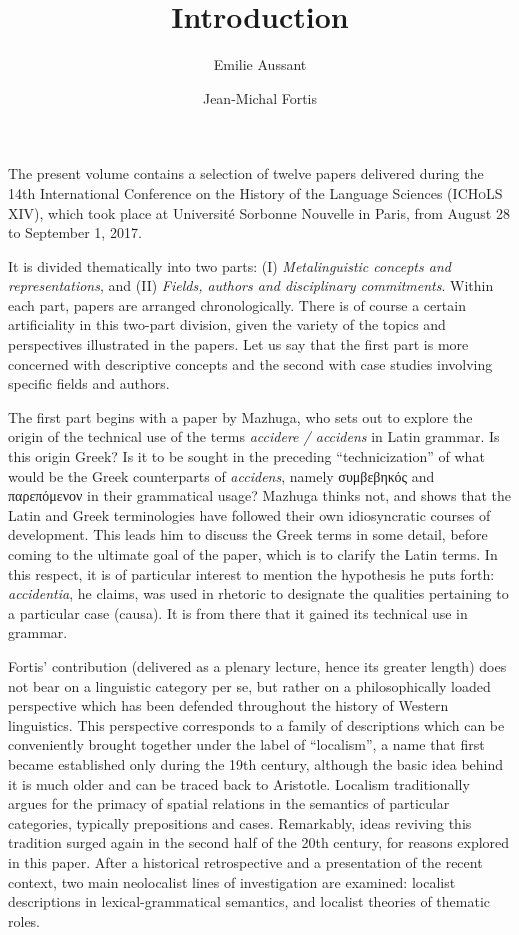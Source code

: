 \documentclass[output=paper]{langsci/langscibook}
\title{Introduction}
\author{Emilie Aussant  \affiliation{Histoire des Théories Linguistiques (CNRS / Université de Paris)} \and Jean-Michal Fortis \affiliation{Histoire des Théories Linguistiques (CNRS / Université de Paris)}}
\begin{document}
\maketitle

\noindent The present volume contains a selection of twelve papers delivered during the 14th International Conference on the History of the Language Sciences (\textsc{ICHoLS XIV}), which took place at Université Sorbonne Nouvelle in Paris, from August 28 to September 1, 2017.

It is divided thematically into two parts: (I) \emph{Metalinguistic concepts and representations}, and (II) \emph{Fields, authors and disciplinary commitments}. Within each part, papers are arranged chronologically. There is of course a certain artificiality in this two-part division, given the variety of the topics and perspectives illustrated in the papers. Let us say that the first part is more concerned with descriptive concepts and the second with case studies involving specific fields and authors.

The first part begins with a paper by Mazhuga, who sets out to explore the origin of the technical use of the terms \emph{accidere / accidens} in Latin grammar. Is this origin Greek? Is it to be sought in the preceding ``technicization'' of what would be the Greek counterparts of \emph{accidens}, namely συμβεβηκός and παρεπόμενον in their grammatical usage? Mazhuga thinks not, and shows that the Latin and Greek terminologies have followed their own idiosyncratic courses of development. This leads him to discuss the Greek terms in some detail, before coming to the ultimate goal of the paper, which is to clarify the Latin terms. In this respect, it is of particular interest to mention the hypothesis he puts forth: \emph{accidentia}, he claims, was used in rhetoric to designate the qualities pertaining to a particular case (causa). It is from there that it gained its technical use in grammar.

Fortis' contribution (delivered as a plenary lecture, hence its greater length) does not bear on a linguistic category per se, but rather on a philosophically loaded perspective which has been defended throughout the history of Western linguistics. This perspective corresponds to a family of descriptions which can be conveniently brought together under the label of ``localism'', a name that first became established only during the 19th century, although the basic idea behind it is much older and can be traced back to Aristotle. Localism traditionally argues for the primacy of spatial relations in the semantics of particular categories, typically prepositions and cases. Remarkably, ideas reviving this tradition surged again in the second half of the 20th century, for reasons explored in this paper. After a historical retrospective and a presentation of the recent context, two main neolocalist lines of investigation are examined: localist descriptions in lexical-grammatical semantics, and localist theories of thematic roles.
\end{document}
